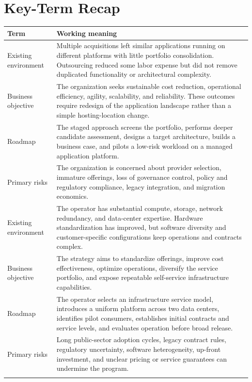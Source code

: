\documentclass[11pt]{article}
\begin{document}
\section{Key-Term Recap}
\begin{longtable}{@{}>{\RaggedRight\arraybackslash}p{}>{\RaggedRight\arraybackslash}p{}@{}}
\toprule\rowcolor{Navy}\color{white}\textbf{Term} & \color{white}\textbf{Working meaning}\\\midrule\endhead
Existing environment & Multiple acquisitions left similar applications running on different platforms with little portfolio consolidation. Outsourcing reduced some labor expense but did not remove duplicated functionality or architectural complexity. \\\addlinespace[2pt]
Business objective & The organization seeks sustainable cost reduction, operational efficiency, agility, scalability, and reliability. These outcomes require redesign of the application landscape rather than a simple hosting-location change. \\\addlinespace[2pt]
Roadmap & The staged approach screens the portfolio, performs deeper candidate assessment, designs a target architecture, builds a business case, and pilots a low-risk workload on a managed application platform. \\\addlinespace[2pt]
Primary risks & The organization is concerned about provider selection, immature offerings, loss of governance control, policy and regulatory compliance, legacy integration, and migration economics. \\\addlinespace[2pt]
Existing environment & The operator has substantial compute, storage, network redundancy, and data-center expertise. Hardware standardization has improved, but software diversity and customer-specific configurations keep operations and contracts complex. \\\addlinespace[2pt]
Business objective & The strategy aims to standardize offerings, improve cost effectiveness, optimize operations, diversify the service portfolio, and expose repeatable self-service infrastructure capabilities. \\\addlinespace[2pt]
Roadmap & The operator selects an infrastructure service model, introduces a uniform platform across two data centers, identifies pilot consumers, establishes initial contracts and service levels, and evaluates operation before broad release. \\\addlinespace[2pt]
Primary risks & Long public-sector adoption cycles, legacy contract rules, regulatory uncertainty, software heterogeneity, up-front investment, and unclear pricing or service guarantees can undermine the program. \\\addlinespace[2pt]

\end{longtable}
\end{document}
